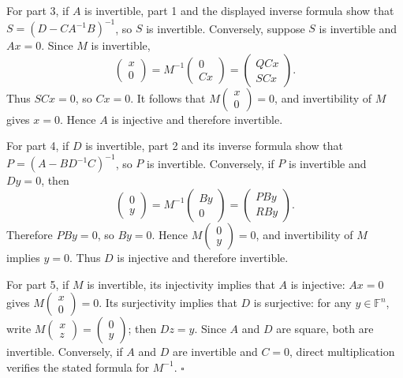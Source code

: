 \documentclass[a4paper,11pt,abstract=true]{scrartcl}
\theoremstyle{dotlessP}
\theoremstyle{dotlessS}
\theoremstyle{remark}
\theoremstyle{definition}
\begin{document}
\begin{claim_box}
For part 3, if $A$ is invertible, part 1 and the displayed inverse
formula show that $S=(D-CA^{-1}B)^{-1}$, so $S$ is invertible.
Conversely, suppose $S$ is invertible and $Ax=0$. Since $M$ is
invertible,
\[
\begin{pmatrix}x\\0\end{pmatrix}
=M^{-1}\begin{pmatrix}0\\Cx\end{pmatrix}
=\begin{pmatrix}QCx\\SCx\end{pmatrix}.
\]
Thus $SCx=0$, so $Cx=0$. It follows that
$M\begin{pmatrix}x\\0\end{pmatrix}=0$, and invertibility of $M$
gives $x=0$. Hence $A$ is injective and therefore invertible.

For part 4, if $D$ is invertible, part 2 and its inverse formula show
that $P=(A-BD^{-1}C)^{-1}$, so $P$ is invertible. Conversely,
if $P$ is invertible and $Dy=0$, then
\[
\begin{pmatrix}0\\y\end{pmatrix}
=M^{-1}\begin{pmatrix}By\\0\end{pmatrix}
=\begin{pmatrix}PBy\\RBy\end{pmatrix}.
\]
Therefore $PBy=0$, so $By=0$. Hence
$M\begin{pmatrix}0\\y\end{pmatrix}=0$, and invertibility of $M$
implies $y=0$. Thus $D$ is injective and therefore invertible.

For part 5, if $M$ is invertible, its injectivity implies that $A$ is
injective: $Ax=0$ gives $M\begin{pmatrix}x\\0\end{pmatrix}=0$.
Its surjectivity implies that $D$ is surjective: for any $y\in\mathbb{F}^n$,
write $M\begin{pmatrix}x\\z\end{pmatrix}=\begin{pmatrix}0\\y\end{pmatrix}$;
then $Dz=y$. Since $A$ and $D$ are square, both are invertible.
Conversely, if $A$ and $D$ are invertible and $C=0$, direct
multiplication verifies the stated formula for $M^{-1}$.
\hfill$\square$
\end{claim_box}
\end{document}

